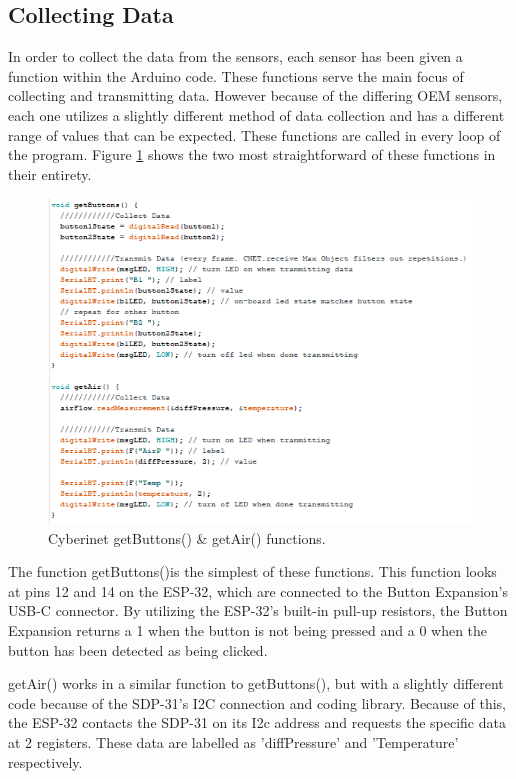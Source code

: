 \subsection{Collecting Data}
In order to collect the data from the sensors, each sensor has been given a function within the Arduino code. These functions serve the main focus of collecting and transmitting data. However because of the differing OEM sensors, each one utilizes a slightly different method of data collection and has a different range of values that can be expected. These functions are called in every loop of the program. Figure \ref{fig:getButtonsGetAir} shows the two most straightforward of these functions in their entirety.

\begin{center}
    \begin{figure}
        \centering
        \includegraphics[scale=1.5]{diagrams/maxPatches/getbuttonsgetair.png}
        \caption{Cyberinet getButtons() \& getAir() functions.}
        \label{fig:getButtonsGetAir}
    \end{figure}
\end{center}

The function getButtons()is the simplest of these functions. This function looks at pins 12 and 14 on the ESP-32, which are connected to the Button Expansion's USB-C connector. By utilizing the ESP-32's built-in pull-up resistors, the Button Expansion returns a 1 when the button is not being pressed and a 0 when the button has been detected as being clicked.

getAir() works in a similar function to getButtons(), but with a slightly different code because of the SDP-31's I2C connection and coding library. Because of this, the ESP-32 contacts the SDP-31 on its I2c address and requests the specific data at 2 registers. These data are labelled as 'diffPressure' and 'Temperature' respectively. 

